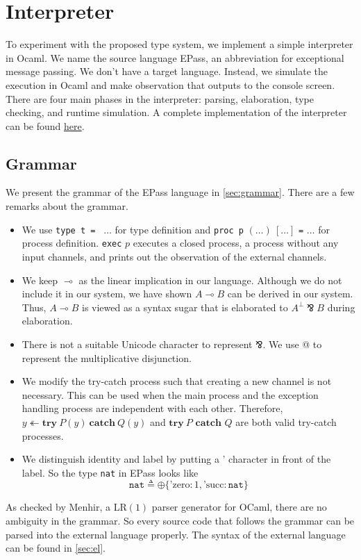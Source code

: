 \documentclass[12pt, openany]{memoir}
\newcommand*{\pare}[0]{\mathbin{\bindnasrepma}}
\newcommand*{\trycatch}[3]{#3 \twoheadleftarrow	\textbf{try}\ #1(#3)\ \textbf{catch}\ #2(#3)}
\begin{document}
\chapter{Interpreter}
To experiment with the proposed type system, we implement a simple interpreter in Ocaml. 
We name the source language EPass, an abbreviation for exceptional message passing. We don't have a target language.
Instead, we simulate the execution in Ocaml and make observation that outputs to the console screen.
There are four main phases in the interpreter: parsing, elaboration, type checking, and runtime simulation.
A complete implementation of the interpreter can be found \href{https://github.com/cekington/ePass}{here}.
\section{Grammar} 
We present the grammar of the EPass language in \cref{sec:grammar}. There are a few remarks about the grammar.
\begin{itemize}
  \item We use \texttt{type t = } $\ldots$ for type definition and \texttt{proc p} $(\ldots)\ [\ldots]$ \texttt{=} $\ldots$ for process definition.
  \texttt{exec} $p$ executes a closed process, a process without any input channels, and prints out the observation of the external channels. 
  \item We keep $\multimap$ as the linear implication in our language. Although we do not include it in our system, we have shown $A \multimap B$ can be derived in our system.
  Thus, $A \multimap B$ is viewed as a syntax sugar that is elaborated to $A^\bot \pare B$ during elaboration.
  \item There is not a suitable Unicode character to represent $\pare$. We use @ to represent the multiplicative disjunction.
  \item We modify the try-catch process such that creating a new channel is not necessary. 
  This can be used when the main process and the exception handling process are independent with each other.
  Therefore, $\trycatch{P}{Q}{y}$ and $\textbf{try}\ P \textbf{ catch } Q$ are both valid try-catch processes.
  \item We distinguish identity and label by putting a ' character in front of the label. So the type \texttt{nat} in EPass looks like
  \[
    \texttt{nat} \triangleq \oplus\{\text{'zero} : 1 , \text{'succ} : \texttt{nat}\}
  \]
\end{itemize}
As checked by Menhir, a LR$(1)$ parser generator for OCaml, there are no ambiguity in the grammar.
So every source code that follows the grammar can be parsed into the external language properly.
The syntax of the external language can be found in \cref{sec:el}.
\end{document}
